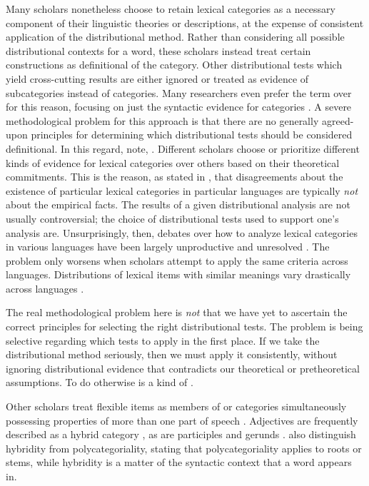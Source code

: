 Many scholars nonetheless choose to retain lexical categories as a necessary component of their linguistic theories or descriptions, at the expense of consistent application of the distributional method. Rather than considering all possible distributional contexts for a word, these scholars instead treat certain constructions as definitional of the category. Other distributional tests which yield cross-cutting results are either ignored or treated as evidence of subcategories instead of categories. Many researchers even prefer the term  over  for this reason, focusing on just the syntactic evidence for categories \parencites{Baker2003}{Rauh2010}. A severe methodological problem for this approach is that there are no generally agreed-upon principles for determining which distributional tests should be considered definitional. In this regard, \textcite[4]{SchachterShopen2007} note,  . Different scholars choose or prioritize different kinds of evidence for lexical categories over others based on their theoretical commitments. This is the reason, as stated in , that disagreements about the existence of particular lexical categories in particular languages are typically \emph{not} about the empirical facts. The results of a given distributional analysis are not usually controversial; the choice of distributional tests used to support one's analysis are. Unsurprisingly, then, debates over how to analyze lexical categories in various languages have been largely unproductive and unresolved \parencite[435]{Croft2005}. The problem only worsens when scholars attempt to apply the same criteria across languages. Distributions of lexical items with similar meanings vary drastically across languages \parencite[§1.4.1]{Croft2001b}.

The real methodological problem here is \emph{not} that we have yet to ascertain the correct principles for selecting the right distributional tests. The problem is being selective regarding which tests to apply in the first place. If we take the distributional method seriously, then we must apply it consistently, without ignoring distributional evidence that contradicts our theoretical or pretheoretical assumptions. To do otherwise is a kind of  \parencite[30, 41]{Croft2001b}.

Other scholars treat flexible items as members of  or  categories simultaneously possessing properties of more than one part of speech \parencites[149]{Loisetal2017}{Malouf1999}{NikolaevaSpencer2020}. Adjectives are frequently described as a hybrid category \parencites{Wetzer1996}[343]{Stassen1997}[13--16]{Pustet2003}[95]{GenettiHildebrandt2004}{Lier2017}, as are participles \parencite[704]{HopperThompson1984} and gerunds \parencite{Denison2001}. \textcite[149]{Loisetal2017} also distinguish hybridity from polycategoriality, stating that polycategoriality applies to roots or stems, while hybridity is a matter of the syntactic context that a word appears in.

